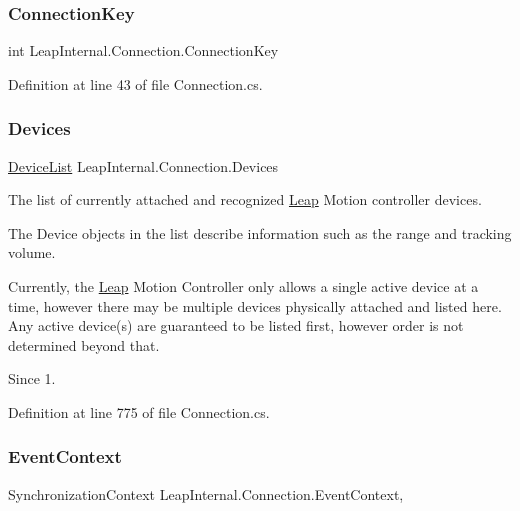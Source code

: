 \subsubsection{\texorpdfstring{ConnectionKey}{ConnectionKey}}
{\footnotesize\ttfamily int Leap\+Internal.\+Connection.\+Connection\+Key\hspace{0.3cm}{\ttfamily [get]}}



Definition at line 43 of file Connection.\+cs.

\mbox{\label{class_leap_internal_1_1_connection_a986b77cb70270ee5d44d1d83db845dfe}} 
\subsubsection{\texorpdfstring{Devices}{Devices}}
{\footnotesize\ttfamily \mbox{\hyperlink{class_leap_1_1_device_list}{Device\+List}} Leap\+Internal.\+Connection.\+Devices\hspace{0.3cm}{\ttfamily [get]}}



The list of currently attached and recognized \mbox{\hyperlink{namespace_leap}{Leap}} Motion controller devices. 

The Device objects in the list describe information such as the range and tracking volume.

Currently, the \mbox{\hyperlink{namespace_leap}{Leap}} Motion Controller only allows a single active device at a time, however there may be multiple devices physically attached and listed here. Any active device(s) are guaranteed to be listed first, however order is not determined beyond that.

\begin{DoxySince}{Since}
1. 
\end{DoxySince}


Definition at line 775 of file Connection.\+cs.

\mbox{\label{class_leap_internal_1_1_connection_a0b87a8b7adf1357944915bd206150db3}} 
\subsubsection{\texorpdfstring{EventContext}{EventContext}}
{\footnotesize\ttfamily Synchronization\+Context Leap\+Internal.\+Connection.\+Event\+Context\hspace{0.3cm}{\ttfamily [get]}, {\ttfamily [set]}}



